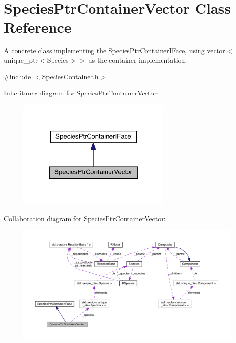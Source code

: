\hypertarget{classSpeciesPtrContainerVector}{\section{Species\+Ptr\+Container\+Vector Class Reference}
\label{classSpeciesPtrContainerVector}
}


A concrete class implementing the \hyperlink{classSpeciesPtrContainerIFace}{Species\+Ptr\+Container\+I\+Face}, using vector$<$unique\+\_\+ptr$<$\+Species$>$$>$ as the container implementation.  




{\ttfamily \#include $<$Species\+Container.\+h$>$}



Inheritance diagram for Species\+Ptr\+Container\+Vector\+:\nopagebreak
\begin{figure}[H]
\begin{center}
\leavevmode
\includegraphics[width=216pt]{classSpeciesPtrContainerVector__inherit__graph}
\end{center}
\end{figure}


Collaboration diagram for Species\+Ptr\+Container\+Vector\+:
\nopagebreak
\begin{figure}[H]
\begin{center}
\leavevmode
\includegraphics[width=350pt]{classSpeciesPtrContainerVector__coll__graph}
\end{center}
\end{figure}
